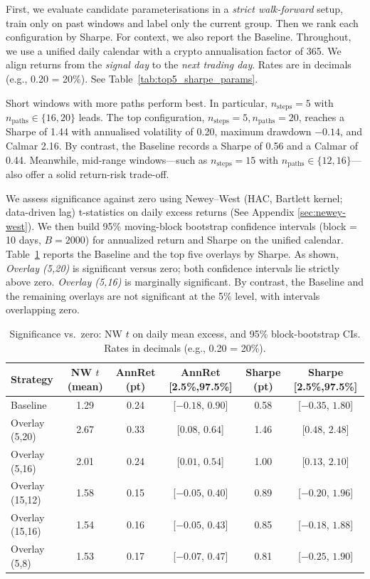 First, we evaluate candidate parameterisations in a \emph{strict walk-forward} setup, train only on past windows and label only the current group. Then we rank each configuration by Sharpe. For context, we also report the Baseline. Throughout, we use a unified daily calendar with a crypto annualisation factor of 365. We align returns from the \emph{signal day} to the \emph{next trading day}. Rates are in decimals (e.g., 0.20 = 20\%). See Table~\ref{tab:top5_sharpe_params}.

Short windows with more paths perform best. In particular, \(n_{\text{steps}}=5\) with \(n_{\text{paths}}\in\{16,20\}\) leads. The top configuration, \(n_{\text{steps}}=5, n_{\text{paths}}=20\), reaches a Sharpe of 1.44 with annualised volatility of 0.20, maximum drawdown \(-0.14\), and Calmar 2.16. By contrast, the Baseline records a Sharpe of 0.56 and a Calmar of 0.44. Meanwhile, mid-range windows—such as \(n_{\text{steps}}=15\) with \(n_{\text{paths}}\in\{12,16\}\)—also offer a solid return-risk trade-off.

We assess significance against zero using Newey--West (HAC, Bartlett kernel; data-driven lag) t-statistics \cite{NeweyWest1994} on daily excess returns (See Appendix \ref{sec:newey-west}).
We then build 95\% moving-block bootstrap confidence intervals (block = 10 days, $B=2000$) for annualized return and Sharpe on the unified calendar.
Table~\ref{tab:sig_compact} reports the Baseline and the top five overlays by Sharpe.
As shown, \emph{Overlay (5,20)} is significant versus zero; both confidence intervals lie strictly above zero.
\emph{Overlay (5,16)} is marginally significant.
By contrast, the Baseline and the remaining overlays are not significant at the 5\% level, with intervals overlapping zero.

\begin{table}[t]
\centering
\caption{Significance vs.\ zero: NW $t$ on daily mean excess, and 95\% block-bootstrap CIs. Rates in decimals (e.g., 0.20 = 20\%).}
\label{tab:sig_compact}
\small
\begin{tabular}{lccccc}
\toprule
Strategy & NW $t$ (mean) & AnnRet (pt) & AnnRet [2.5\%,97.5\%] & Sharpe (pt) & Sharpe [2.5\%,97.5\%] \\
\midrule
Baseline        & 1.29 & 0.24 & [$-0.18$, $0.90$] & 0.58 & [$-0.35$, $1.80$] \\
Overlay (5,20)  & 2.67 & 0.33 & [$0.08$,  $0.64$] & 1.46 & [$0.48$,  $2.48$] \\
Overlay (5,16)  & 2.01 & 0.24 & [$0.01$,  $0.54$] & 1.00 & [$0.13$,  $2.10$] \\
Overlay (15,12) & 1.58 & 0.15 & [$-0.05$, $0.40$] & 0.89 & [$-0.20$, $1.96$] \\
Overlay (15,16) & 1.54 & 0.16 & [$-0.05$, $0.43$] & 0.85 & [$-0.18$, $1.88$] \\
Overlay (5,8)   & 1.53 & 0.17 & [$-0.07$, $0.47$] & 0.81 & [$-0.25$, $1.90$] \\
\bottomrule
\end{tabular}
\end{table}

